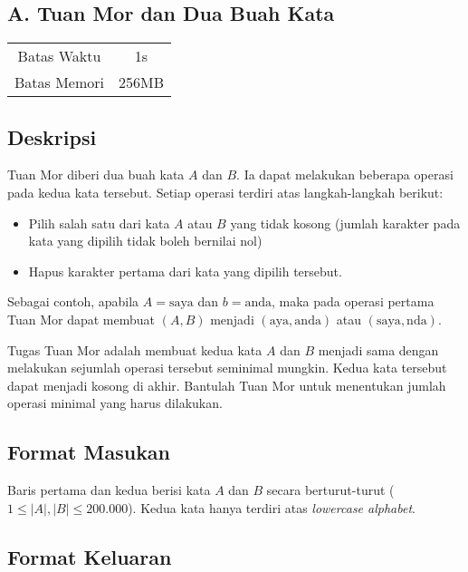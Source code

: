 \documentclass{article}
\begin{document}
\begin{center}
    \section*{A. Tuan Mor dan Dua Buah Kata}

    \begin{tabular}{ | c c | }
        \hline
        Batas Waktu  & 1s \\  
        Batas Memori & 256MB \\
        \hline
    \end{tabular}
\end{center}

\subsection*{Deskripsi}

Tuan Mor diberi dua buah kata $A$ dan $B$. Ia dapat melakukan beberapa operasi pada kedua kata tersebut. Setiap operasi terdiri atas langkah-langkah berikut:

\begin{itemize}
    \setlength\itemsep{0pt}
    \item Pilih salah satu dari kata $A$ atau $B$ yang tidak kosong (jumlah karakter pada kata yang dipilih tidak boleh bernilai nol)
    \item Hapus karakter pertama dari kata yang dipilih tersebut.
\end{itemize}

Sebagai contoh, apabila $A = \text{saya}$ dan $b = \text{anda}$, maka pada operasi pertama Tuan Mor dapat membuat $(A,B)$ menjadi $(\text{aya}, \text{anda})$ atau $(\text{saya}, \text{nda})$.

Tugas Tuan Mor adalah membuat kedua kata $A$ dan $B$ menjadi sama dengan melakukan sejumlah operasi tersebut seminimal mungkin. Kedua kata tersebut dapat menjadi kosong di akhir. Bantulah Tuan Mor untuk menentukan jumlah operasi minimal yang harus dilakukan.

\subsection*{Format Masukan}

Baris pertama dan kedua berisi kata $A$ dan $B$ secara berturut-turut ($1 \leq |A|, |B| \leq 200.000$). Kedua kata hanya terdiri atas \textit{lowercase alphabet}.  

\subsection*{Format Keluaran}
\end{document}

